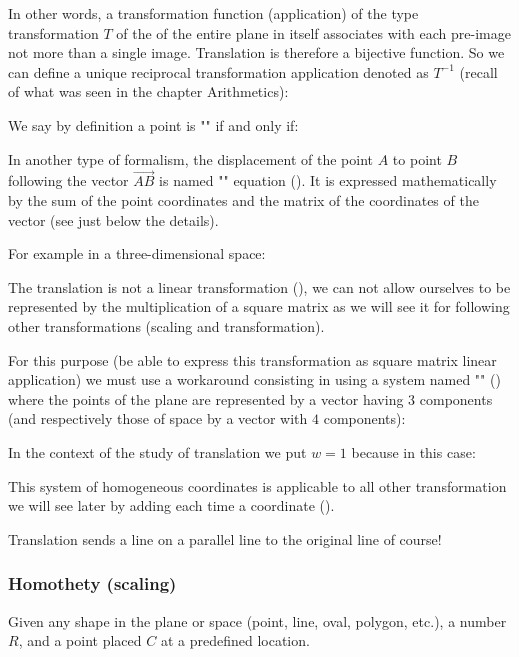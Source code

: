 	In other words, a transformation function (application) of the type transformation $T$ of the of the entire plane in itself associates with each pre-image not more than a single image. Translation is therefore a bijective function. So we can define a unique reciprocal transformation application denoted as $T^{-1}$ (recall of what was seen in the chapter Arithmetics):
	
	We say by definition a point is "" if and only if:
	
	In another type of formalism, the displacement of the point $A$ to point $B$ following the vector $\overrightarrow{AB}$ is named "" equation (). It is expressed mathematically by the sum of the point coordinates and the matrix of the coordinates of the vector (see just below the details).
	
	For example in a three-dimensional space:
	
	The translation is not a linear transformation (), we can not allow ourselves to be represented by the multiplication of a square matrix as we will see it for following other transformations (scaling and transformation).

	For this purpose (be able to express this transformation as square matrix linear application) we must use a workaround consisting in using a system named "" () where the points of the plane are represented by a vector having $3$ components (and respectively those of space by a vector with $4$ components):
	
	In the context of the study of translation we put $w=1$ because in this case:
	
	This system of homogeneous coordinates is applicable to all other transformation we will see later by adding each time a coordinate ().
	\begin{tcolorbox}[title=Remark,colframe=black,arc=10pt]
	Translation sends a line on a parallel line to the original line of course!	
	\end{tcolorbox}

	\subsubsection{Homothety (scaling)}\label{scaling}
	Given any shape in the plane or space (point, line, oval, polygon, etc.), a number $R$, and a point placed $C$ at a predefined location.

